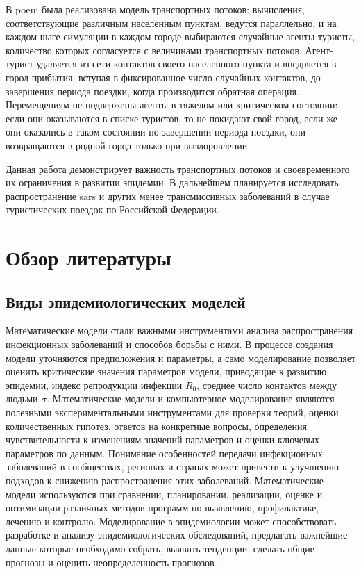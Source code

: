 \documentclass[a4paper,12pt]{article} %
\begin{document}
В \gls{poem} была реализована модель транспортных потоков: вычисления, соответствующие различным населенным пунктам, ведутся параллельно, и на каждом шаге симуляции в каждом городе выбираются случайные агенты-туристы, количество которых согласуется с величинами транспортных потоков. Агент-турист удаляется из сети контактов своего населенного пункта и внедряется в город прибытия, вступая в фиксированное число случайных контактов, до завершения периода поездки, когда производится обратная операция. Перемещениям не подвержены агенты в тяжелом или критическом состоянии: если они оказываются в списке туристов, то не покидают свой город, если же они оказались в таком состоянии по завершении периода поездки, они возвращаются в родной город только при выздоровлении.

Данная работа демонстрирует важность транспортных потоков и своевременного их ограничения в развитии эпидемии. В дальнейшем планируется исследовать распространение \gls{sars} и других менее трансмиссивных заболеваний в случае туристических поездок по Российской Федерации.


\newpage
\section{Обзор литературы}
\subsection{Виды эпидемиологических моделей}

Математические модели стали важными инструментами анализа распространения инфекционных заболеваний и способов борьбы с ними. В процессе создания модели уточняются предположения и параметры, а само моделирование позволяет оценить критические значения параметров модели, приводящие к развитию эпидемии, индекс репродукции инфекции $R_0$, среднее число контактов между людьми $\sigma$. Математические модели и компьютерное моделирование являются полезными экспериментальными инструментами для проверки теорий, оценки количественных гипотез, ответов на конкретные вопросы, определения чувствительности к изменениям значений параметров и оценки ключевых параметров по данным. Понимание особенностей передачи инфекционных заболеваний в сообществах, регионах и странах может привести к улучшению подходов к снижению распространения этих заболеваний. Математические модели используются при сравнении, планировании, реализации, оценке и оптимизации различных методов
программ по выявлению, профилактике, лечению и контролю. Моделирование в эпидемиологии может способствовать разработке и анализу эпидемиологических обследований, предлагать важнейшие данные которые необходимо собрать, выявить тенденции, сделать общие прогнозы и оценить неопределенность прогнозов \cite{hethcote2000mathematics, hethcote1989three,hethcote1992transmission}.
\end{document}

